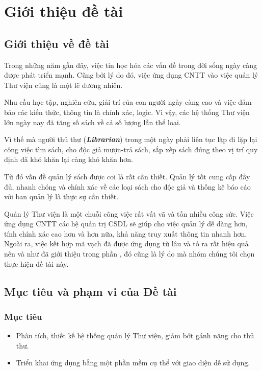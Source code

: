 \documentclass[12pt]{report}
\begin{document}
\newpage
	\thispagestyle{empty}
	\tableofcontents	

	\newpage
	\listoffigures

\newpage		
	\chapter{Giới thiệu đề tài}	
		\label{introduction_chapter}
		\section{Giới thiệu về đề tài}
		\par Trong những năm gần đây, việc tin học hóa các vấn đề trong đời sống ngày càng được phát triển mạnh. Cũng bởi lý do đó, việc ứng dụng CNTT vào việc quản lý Thư viện cũng là một lẽ đương nhiên.
		\par Nhu cầu học tập, nghiên cứu, giải trí của con người ngày càng cao và việc đảm bảo các kiến thức, thông tin là chính xác, logic. Vì vậy, các hệ thống Thư viện lớn ngày nay đã tăng số sách về cả số lượng lẫn thể loại.
		\par Vì thế mà người thủ thư (\textbf{\textit{Librarian}}) trong một ngày phải liên tục lặp đi lặp lại công việc tìm sách, cho độc giả mượn-trả sách, sắp xếp sách đúng theo vị trí quy định đã khó khăn lại càng khó khăn hơn.
		\par Từ đó vấn đề quản lý sách được coi là rất cần thiết. Quản lý tốt cung cấp đầy đủ, nhanh chóng và chính xác về các loại sách cho độc giả và thống kê báo cáo với ban quản lý là thực sự cần thiết.
		\par Quản lý Thư viện là một chuỗi công việc rất vất vã và tốn nhiều công sức. Việc ứng dụng CNTT các hệ quản trị CSDL sẽ giúp cho việc quản lý dễ dàng hơn, tính chính xác cao hơn và hơn nữa, khả năng truy xuất thông tin nhanh hơn. Ngoài ra, việc kết hợp mã vạch đã được ứng dụng từ lâu và tỏ ra rất hiệu quả nên và như đã giới thiệu trong phần \textbf{}, đó cũng là lý do mà nhóm chúng tôi chọn thực hiện đề tài này.
		\section{Mục tiêu và phạm vi của Đề tài}
			\subsection{Mục tiêu}
			\begin{itemize}
				\item{Phân tích, thiết kế hệ thống quản lý Thư viện, giảm bớt gánh nặng cho thủ thư.}
				\item{Triển khai ứng dụng bằng một phần mềm cụ thể với giao diện dễ sử dụng.}
			\end{itemize}
\end{document}
